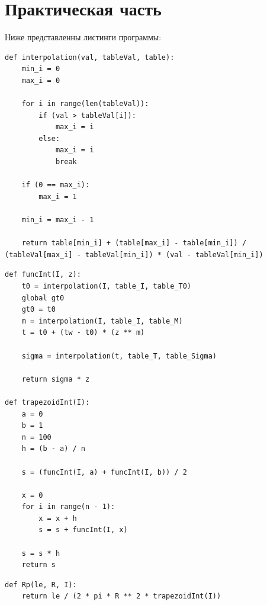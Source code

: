 \chapter{Практическая часть}

Ниже представленны листинги программы:

\lstset{language=python}
\begin{lstlisting}[caption=Интерполяция]
def interpolation(val, tableVal, table):
    min_i = 0
    max_i = 0

    for i in range(len(tableVal)):
        if (val > tableVal[i]):
            max_i = i
        else:
            max_i = i
            break

    if (0 == max_i):
        max_i = 1

    min_i = max_i - 1

    return table[min_i] + (table[max_i] - table[min_i]) / (tableVal[max_i] - tableVal[min_i]) * (val - tableVal[min_i])

\end{lstlisting}

\lstset{language=python}
\begin{lstlisting}[caption=Интегрирование методом трапеций]
def funcInt(I, z):
    t0 = interpolation(I, table_I, table_T0)
    global gt0
    gt0 = t0
    m = interpolation(I, table_I, table_M)
    t = t0 + (tw - t0) * (z ** m)

    sigma = interpolation(t, table_T, table_Sigma)

    return sigma * z

def trapezoidInt(I):
    a = 0
    b = 1
    n = 100
    h = (b - a) / n

    s = (funcInt(I, a) + funcInt(I, b)) / 2

    x = 0
    for i in range(n - 1):
        x = x + h
        s = s + funcInt(I, x)

    s = s * h
    return s
\end{lstlisting}

\lstset{language=python}
\begin{lstlisting}[caption=Нахождение сопротивления]
def Rp(le, R, I):
    return le / (2 * pi * R ** 2 * trapezoidInt(I))
\end{lstlisting}

